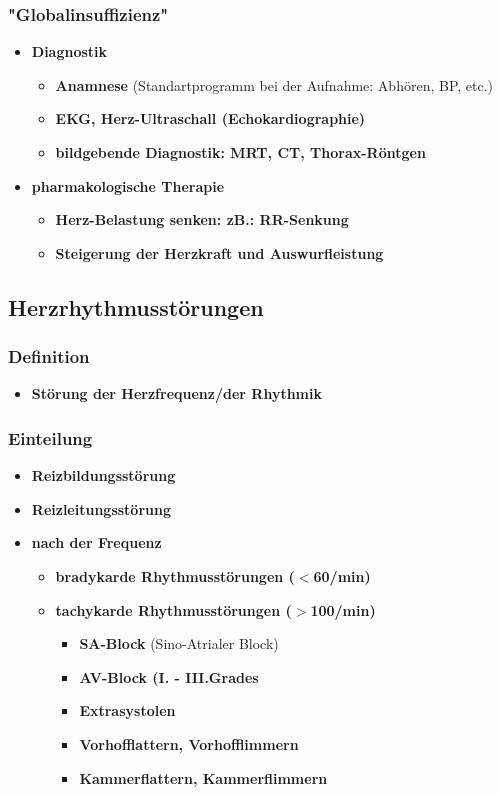 	\subsubsection{"Globalinsuffizienz"}
		\begin{itemize}	
			\item \textbf{Diagnostik}
				\begin{itemize}
					\item \textbf{Anamnese} (Standartprogramm bei der Aufnahme: Abhören, BP, etc.)
					\item \textbf{EKG, Herz-Ultraschall (Echokardiographie)}
					\item \textbf{bildgebende Diagnostik: MRT, CT, Thorax-Röntgen}
				\end{itemize}
			\item \textbf{pharmakologische Therapie}
				\begin{itemize}
					\item \textbf{Herz-Belastung senken: zB.: RR-Senkung}
					\item \textbf{Steigerung der Herzkraft und Auswurfleistung}
				\end{itemize}
		\end{itemize}
\subsection{Herzrhythmusstörungen}
	\subsubsection{Definition}
		\begin{itemize}
			\item \textbf{Störung der Herzfrequenz/der Rhythmik}
		\end{itemize}
	\subsubsection{Einteilung}
		\begin{itemize}
			\item \textbf{Reizbildungsstörung}
			\item \textbf{Reizleitungsstörung}
			\item \textbf{nach der Frequenz}
				\begin{itemize}
					\item \textbf{bradykarde Rhythmusstörungen ($<$60/min)}
					\item \textbf{tachykarde Rhythmusstörungen ($>$100/min)}
						\begin{itemize}
							\item \textbf{SA-Block} (Sino-Atrialer Block)
							\item \textbf{AV-Block (I. - III.Grades}
							\item \textbf{Extrasystolen}
							\item \textbf{Vorhofflattern, Vorhofflimmern}
							\item \textbf{Kammerflattern, Kammerflimmern}								
						\end{itemize}
				\end{itemize}
		\end{itemize}
